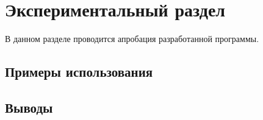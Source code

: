 \chapter{Экспериментальный раздел}
\label{cha:research}

В данном разделе проводится апробация разработанной программы.

\section{Примеры использования}

\section{Выводы}



